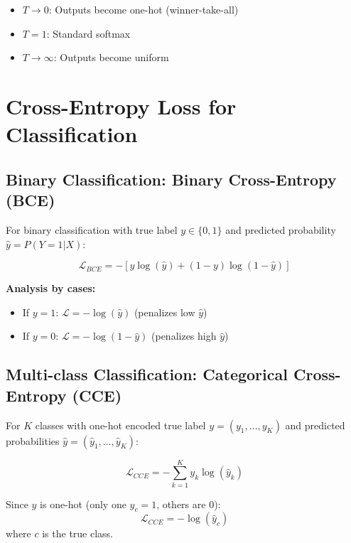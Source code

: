 \begin{itemize}
    \item $T \to 0$: Outputs become one-hot (winner-take-all)
    \item $T = 1$: Standard softmax
    \item $T \to \infty$: Outputs become uniform
\end{itemize}

\section{Cross-Entropy Loss for Classification}

\subsection{Binary Classification: Binary Cross-Entropy (BCE)}

For binary classification with true label $y \in \{0, 1\}$ and predicted probability $\hat{y} = P(Y=1|X)$:

\begin{definition}
\[
\boxed{\mathcal{L}_{BCE} = -[y \log(\hat{y}) + (1-y) \log(1 - \hat{y})]}
\]
\end{definition}

\textbf{Analysis by cases:}
\begin{itemize}
    \item If $y = 1$: $\mathcal{L} = -\log(\hat{y})$ (penalizes low $\hat{y}$)
    \item If $y = 0$: $\mathcal{L} = -\log(1 - \hat{y})$ (penalizes high $\hat{y}$)
\end{itemize}

\subsection{Multi-class Classification: Categorical Cross-Entropy (CCE)}

For $K$ classes with one-hot encoded true label $y = (y_1, \ldots, y_K)$ and predicted probabilities $\hat{y} = (\hat{y}_1, \ldots, \hat{y}_K)$:

\begin{definition}
\[
\boxed{\mathcal{L}_{CCE} = -\sum_{k=1}^{K} y_k \log(\hat{y}_k)}
\]

Since $y$ is one-hot (only one $y_c = 1$, others are 0):
\[
\mathcal{L}_{CCE} = -\log(\hat{y}_c)
\]
where $c$ is the true class.
\end{definition}

